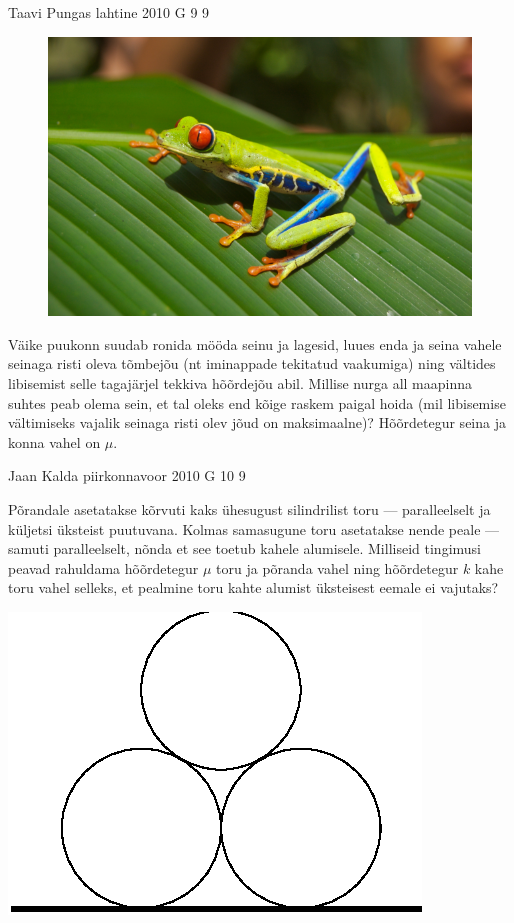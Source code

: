 \documentclass[11pt, twoside]{article}
\begin{document}
{%
{Taavi Pungas} %
{lahtine} %
{2010} %
{G 9} %
{9} %
{
\ifStatement
\begin{figure}
	\vspace{-1.8ex}
	\includegraphics[width=\linewidth]{2010-lahg-09-Red_eyed_tree_frog}
	\vspace{-4ex}
\end{figure}
Väike puukonn suudab ronida mööda seinu ja lagesid, luues enda ja seina vahele 
seinaga risti oleva tõmbejõu (nt iminappade tekitatud vaakumiga) ning vältides libisemist 
selle tagajärjel tekkiva hõõrdejõu abil.
Millise nurga all maapinna suhtes peab olema sein, et tal oleks end kõige raskem paigal hoida 
(mil libisemise vältimiseks vajalik seinaga risti olev jõud on maksimaalne)?
Hõõrdetegur seina ja konna vahel on $\mu$.
\fi
}

{Jaan Kalda} %
{piirkonnavoor} %
{2010} %
{G 10} %
{9} %
{
\ifStatement
Põrandale asetatakse kõrvuti kaks ühesugust silindrilist toru --- paralleelselt ja küljetsi üksteist puutuvana. Kolmas samasugune toru asetatakse nende peale --- samuti paralleelselt, nõnda et see toetub kahele alumisele.
Milliseid tingimusi peavad rahuldama hõõrdetegur $\mu$ toru ja põranda vahel ning hõõrdetegur $k$ kahe toru vahel
selleks, et pealmine toru kahte alumist üksteisest eemale ei vajutaks?

\begin{center}
	\includegraphics[width=0.3\linewidth]{2010-v2g-10-torud.eps}
\end{center}
\fi
}

}
\end{document}
